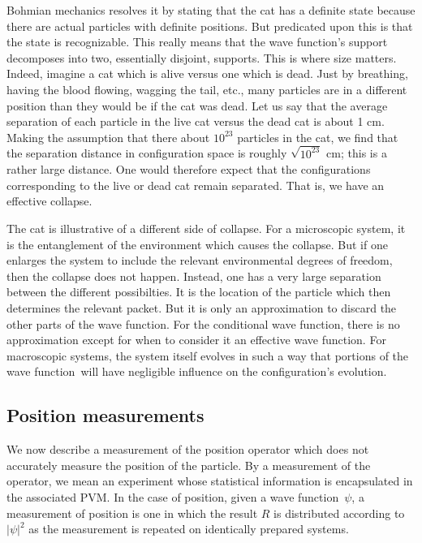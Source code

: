 \documentclass[11pt]{article}
\theoremstyle{remark}
\begin{document}
Bohmian mechanics resolves it by stating that the cat has a definite
state because there are actual particles with definite positions. But
predicated upon this is that the state is recognizable. This really
means that the wave function's support decomposes into two, essentially disjoint,
supports. This is where size matters. Indeed, imagine a
cat which is alive versus one which is dead. Just by breathing, having
the blood flowing, wagging the tail, etc.,  many particles are in a different
position than they would be if the cat was dead. Let us say that the
average separation of each particle in the live cat versus the dead cat is
about 1 cm. Making the assumption that there about $10^{23}$ particles
in the cat, we find that the separation distance in configuration space
is roughly $\sqrt{10^{23}}$ cm; this is a rather large distance. 
One would therefore expect that the configurations corresponding to the
live or dead cat remain separated.
 That is, we have an effective collapse. 

The cat is illustrative of a different side of collapse. For a
microscopic system, it is the entanglement of the environment which
causes the collapse. But if one enlarges the system to include the
relevant environmental degrees of freedom, then the collapse does not
happen. Instead, one has a very large separation between the different
possibilties. It is the location of the particle which then determines
the relevant packet. But it is only an approximation to discard the
other parts of the wave function. For the conditional wave function, there is no
approximation except for when to consider it an effective wave function. For
macroscopic systems, the system itself evolves in such a way that
portions of the wave function\
will have negligible influence on the configuration's evolution.


\subsection{Position measurements}

We now describe a measurement of the position operator which does not
accurately measure the position of the particle. By a measurement of
the operator, we mean an experiment whose statistical information is
encapsulated in the associated PVM. In the case of position, given a
wave function\ \ensuremath{\psi}, a measurement of position is one in which the result $R$ is
distributed according to $\ensuremath{\lvert {\ensuremath{\psi}} \rvert}^2$ as the measurement is repeated
on identically prepared systems. 
\end{document}
